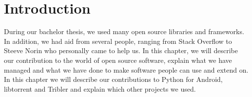 \section{Introduction}
	During our bachelor thesis, we used many open source libraries and frameworks. In addition, we had aid from several people, ranging from Stack Overflow to Steeve Norin who personally came to help us. In this chapter, we will describe our contribution to the world of open source software, explain what we have managed and what we have done to make software people can use and extend on. In this chapter we will describe our contributions to Python for Android, libtorrent and Tribler and explain which other projects we used.